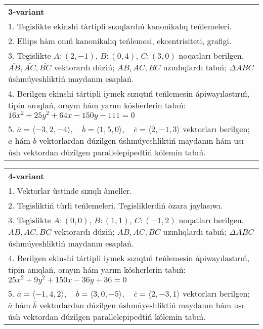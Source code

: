 \documentclass{article}
\begin{document}
\begin{tabular}{m{17cm}}
\textbf{3-variant}\\
1. Tegislikte ekinshi tàrtipli sızıqlardıń kanonikalıq teńlemeleri.\\

2. Ellips hàm onıń kanonikalıq teńlemesi, ekcentrisiteti, grafigi.\\

3. Tegislikte $A: (2, -1)$, $B: (0, 4)$, $C: (3, 0)$ noqatları berilgen. $\overline{AB}, \overline{AC}, \overline{BC}$ vektorardı dúziń; $AB, AC, BC$ uzınlıqlardı tabıń; $\Delta ABC$ úshmúyeshliktiń maydanın esaplań. \\

4. Berilgen ekinshi tártipli iymek sızıqtıń teńlemesin ápiwayılastırıń, tipin anıqlań, orayın hám yarım kósherlerin tabıń: $16x^2+25y^2+64x-150y-111=0$\\

5. \(\overline{a} = \langle -3, 2, -4 \rangle, \quad \overline{b} = \langle 1, 5, 0 \rangle, \quad \overline{c} = \langle 2, -1, 3 \rangle\) vektorları berilgen; \(\overline{a}\) hám \(\overline{b}\) vektorlardan dúzilgen úshmúyeshliktiń maydanın hám usı úsh vektordan dúzilgen parallelepipedtiń kólemin tabıń.
\end{tabular}
\vspace{1cm}


\begin{tabular}{m{17cm}}
\textbf{4-variant}\\
1. Vektorlar ùstinde sızıqlı àmeller.\\

2. Tegisliktiń tùrli teńlemeleri. Tegisliklerdiń òzara jaylasıwı.\\

3. Tegislikte $A: (0, 0)$, $B: (1, 1)$, $C: (-1, 2)$ noqatları berilgen. $\overline{AB}, \overline{AC}, \overline{BC}$ vektorardı dúziń; $AB, AC, BC$ uzınlıqlardı tabıń; $\Delta ABC$ úshmúyeshliktiń maydanın esaplań. \\

4. Berilgen ekinshi tártipli iymek sızıqtıń teńlemesin ápiwayılastırıń, tipin anıqlań, orayın hám yarım kósherlerin tabıń: $25x^2+9y^2+150x-36y+36=0$\\

5. \(\overline{a} = \langle -1, 4, 2 \rangle, \quad \overline{b} = \langle 3, 0, -5 \rangle, \quad \overline{c} = \langle 2, -3, 1 \rangle\) vektorları berilgen; \(\overline{a}\) hám \(\overline{b}\) vektorlardan dúzilgen úshmúyeshliktiń maydanın hám usı úsh vektordan dúzilgen parallelepipedtiń kólemin tabıń.
\end{tabular}
\vspace{1cm}
\end{document}
